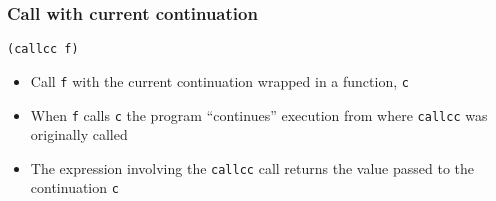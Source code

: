 \documentclass{beamer}
\begin{document}
\begin{frame}[fragile]
\frametitle{Call with current continuation}

\begin{lstlisting}
(callcc f)
\end{lstlisting}

\begin{itemize}
\item Call \texttt{f} with the current continuation wrapped in a
  function, \texttt{c}
\item When \texttt{f} calls \texttt{c} the program ``continues''
  execution from where \texttt{callcc} was originally called
\item The expression involving the \texttt{callcc} call returns the
  value passed to the continuation \texttt{c}
\end{itemize}





\end{frame}
\end{document}
